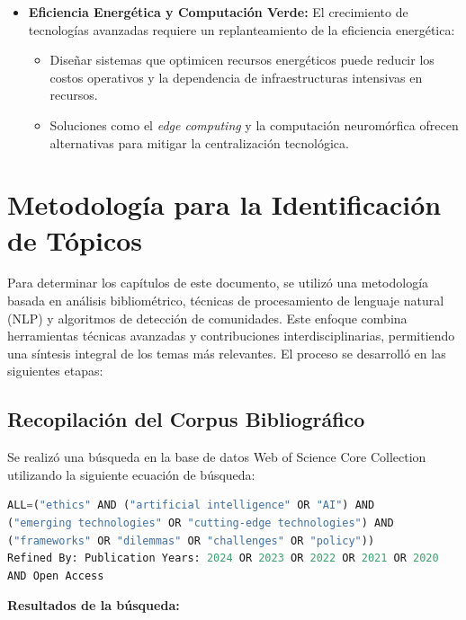 \begin{refsection}
\begin{itemize}
\item \textbf{Eficiencia Energética y Computación Verde:}  
El crecimiento de tecnologías avanzadas requiere un replanteamiento de la eficiencia energética:
\begin{itemize}
    \item Diseñar sistemas que optimicen recursos energéticos puede reducir los costos operativos y la dependencia de infraestructuras intensivas en recursos.
    \item Soluciones como el \textit{edge computing} y la computación neuromórfica ofrecen alternativas para mitigar la centralización tecnológica.
\end{itemize}
\end{itemize}





\section{Metodología para la Identificación de Tópicos}

Para determinar los capítulos de este documento, se utilizó una metodología basada en análisis bibliométrico, técnicas de procesamiento de lenguaje natural (NLP) y algoritmos de detección de comunidades. Este enfoque combina herramientas técnicas avanzadas y contribuciones interdisciplinarias, permitiendo una síntesis integral de los temas más relevantes. El proceso se desarrolló en las siguientes etapas:

\subsection{Recopilación del Corpus Bibliográfico}

Se realizó una búsqueda en la base de datos Web of Science Core Collection utilizando la siguiente ecuación de búsqueda:

\begin{lstlisting}[language=Python, caption={Ecuación de búsqueda en Web of Science}]
ALL=("ethics" AND ("artificial intelligence" OR "AI") AND 
("emerging technologies" OR "cutting-edge technologies") AND 
("frameworks" OR "dilemmas" OR "challenges" OR "policy"))
Refined By: Publication Years: 2024 OR 2023 OR 2022 OR 2021 OR 2020 
AND Open Access
\end{lstlisting}

\textbf{Resultados de la búsqueda:}


\end{refsection}

